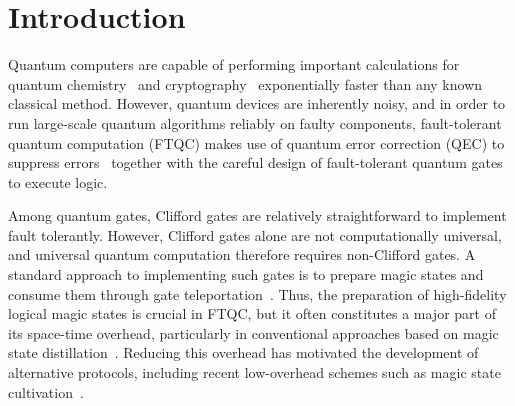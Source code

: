 \documentclass[
 reprint,
 amsmath,amssymb,
 pra,superscriptaddress, nofootinbib
]{revtex4-2}
\theoremstyle{definition}
\theoremstyle{plain}
\begin{document}
\newpage
\section{Introduction}\label{sec:intro}

Quantum computers are capable of performing important calculations for quantum chemistry~\cite{cao2019quantum} and cryptography~\cite{365700,shor1999polynomial} exponentially faster than any known classical method. 
However, quantum devices are inherently noisy, and in order to run large-scale quantum algorithms reliably on faulty components,  fault-tolerant quantum computation (FTQC) makes use of quantum error correction (QEC) to suppress errors~\cite{548464,10.1145/258533.258579,kitaev1997quantum} together with the careful design of fault-tolerant quantum gates to execute logic. 

Among quantum gates, Clifford gates are relatively straightforward to implement fault tolerantly. However, Clifford gates alone are not computationally universal, and universal quantum computation therefore requires non-Clifford gates. A standard approach to implementing such gates is to prepare magic states and consume them through gate teleportation~\cite{PhysRevA.62.052316}. 
Thus, the preparation of high-fidelity logical magic states is crucial in FTQC, but it often constitutes a major part of its space-time overhead, particularly in conventional approaches based on magic state distillation~\cite{PhysRevA.71.022316,PhysRevA.86.032324,PhysRevA.86.052329,Litinski2019magicstate}. Reducing this overhead has motivated the development of alternative protocols, including recent low-overhead schemes such as magic state cultivation~\cite{gidney2024magicstatecultivationgrowing,thxx-njr6,9kys-3whh,gpvl-lg4c,p8tw-6kq9,claes2025cultivatingtstatessurface,ch5r-cnfq,hirano2026efficientmagicstatecultivation,hetenyi2026constantdepthmagicstate}.
\end{document}
